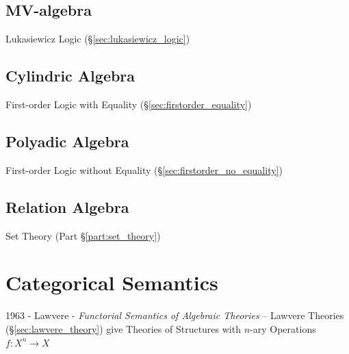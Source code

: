 \subsection{MV-algebra}\label{sec:mv_algebra}

Lukasiewicz Logic (\S\ref{sec:lukasiewicz_logic})



\subsection{Cylindric Algebra}\label{sec:cylindric_algebra}

First-order Logic with Equality (\S\ref{sec:firstorder_equality})



\subsection{Polyadic Algebra}\label{sec:polyadic_algebra}

First-order Logic without Equality
(\S\ref{sec:firstorder_no_equality})



\subsection{Relation Algebra}\label{sec:relation_algebra}

Set Theory (Part \S\ref{part:set_theory})



\section{Categorical Semantics}\label{sec:categorical_semantics}

1963 - Lawvere - \emph{Functorial Semantics of Algebraic Theories} -- Lawvere
Theories (\S\ref{sec:lawvere_theory}) give Theories of Structures with $n$-ary
Operations $f : X^n \rightarrow X$


